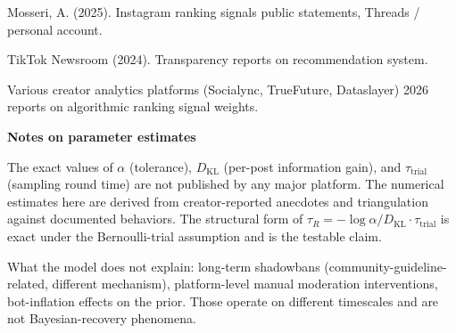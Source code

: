 \documentclass[12pt]{article}
\begin{document}
\medskip
\noindent[2] Mosseri, A. (2025). Instagram ranking signals public statements, Threads / personal account.

\medskip
\noindent[3] TikTok Newsroom (2024). Transparency reports on recommendation system.

\medskip
\noindent[4] Various creator analytics platforms (Socialync, TrueFuture, Dataslayer) 2026 reports on algorithmic ranking signal weights.

\vspace{0.6cm}

\noindent\textbf{Notes on parameter estimates}

\medskip
\noindent The exact values of $\alpha$ (tolerance), $D_{\mathrm{KL}}$ (per-post information gain), and $\tau_{\text{trial}}$ (sampling round time) are not published by any major platform. The numerical estimates here are derived from creator-reported anecdotes and triangulation against documented behaviors. The structural form of $\tau_R = -\log\alpha / D_{\mathrm{KL}} \cdot \tau_{\text{trial}}$ is exact under the Bernoulli-trial assumption and is the testable claim.

\medskip
\noindent What the model does not explain: long-term shadowbans (community-guideline-related, different mechanism), platform-level manual moderation interventions, bot-inflation effects on the prior. Those operate on different timescales and are not Bayesian-recovery phenomena.
\end{document}
